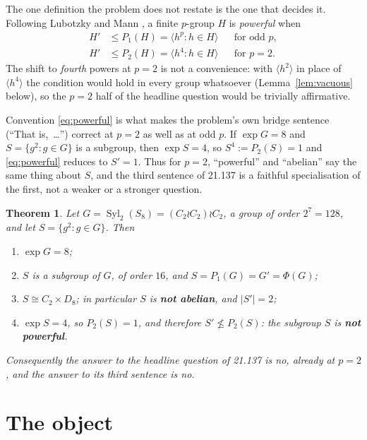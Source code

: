 \documentclass[11pt]{amsart}
\newtheorem{theorem}{Theorem}
\theoremstyle{remark}
\DeclareMathOperator{\Syl}{Syl}
\begin{document}
The one definition the problem does not restate is the one that decides it. Following
Lubotzky and Mann \cite[\S1]{LubotzkyMann}, a finite $p$-group $H$ is \emph{powerful} when
\begin{equation}\label{eq:powerful}
\begin{aligned}
  H'&\le P_1(H)=\langle h^p:h\in H\rangle && \text{for odd }p,\\
  H'&\le P_2(H)=\langle h^4:h\in H\rangle && \text{for }p=2 .
\end{aligned}
\end{equation}
The shift to \emph{fourth} powers at $p=2$ is not a convenience: with $\langle
h^2\rangle$ in place of $\langle h^4\rangle$ the condition would hold in every group
whatsoever (Lemma~\ref{lem:vacuous} below), so the $p=2$ half of the headline question
would be trivially affirmative.

Convention \eqref{eq:powerful} is what makes the problem's own bridge sentence
(``That is,~\dots'') correct at $p=2$ as well as at odd $p$. If $\exp G=8$ and
$S=\{g^2:g\in G\}$ is a subgroup, then $\exp S=4$, so $S^4:=P_2(S)=1$ and
\eqref{eq:powerful} reduces to $S'=1$. Thus for $p=2$, ``powerful'' and ``abelian'' say the
same thing about $S$, and the third sentence of 21.137 is a faithful specialisation of the
first, not a weaker or a stronger question.

\begin{theorem}\label{thm:main}
Let $G=\Syl_2(S_8)=(C_2\wr C_2)\wr C_2$, a group of order $2^7=128$, and let
$S=\{g^2:g\in G\}$. Then
\begin{enumerate}
\item[(i)] $\exp G=8$;
\item[(ii)] $S$ is a subgroup of $G$, of order $16$, and $S=P_1(G)=G'=\Phi(G)$;
\item[(iii)] $S\cong C_2\times D_8$; in particular $S$ is \textbf{not abelian}, and
      $|S'|=2$;
\item[(iv)] $\exp S=4$, so $P_2(S)=1$, and therefore $S'\not\le P_2(S)$: the subgroup $S$
      is \textbf{not powerful}.
\end{enumerate}
Consequently the answer to the headline question of 21.137 is \emph{no}, already at $p=2$,
and the answer to its third sentence is \emph{no}.
\end{theorem}

\section{The object}
\end{document}

